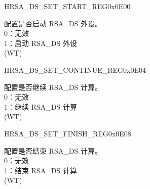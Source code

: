 \begin{register}{H}{RSA\_DS\_SET\_START\_REG}{0x0E00}\label{regdesc:RSADSSETSTARTREG}
%
%
\regnewline%
\begin{regdesc}\begin{reglist}
\label{fielddesc:RSADSSETSTART}\item [RSA\_DS\_SET\_START] 配置是否启动 RSA\_DS 外设。\\
0：无效\\
1：启动 RSA\_DS 外设\\
(WT)
\end{reglist}\end{regdesc}
\end{register}


\begin{register}{H}{RSA\_DS\_SET\_CONTINUE\_REG}{0x0E04}\label{regdesc:RSADSSETCONTINUEREG}
%
%
\regnewline%
\begin{regdesc}\begin{reglist}
\label{fielddesc:RSADSSETCONTINUE}\item [RSA\_DS\_SET\_CONTINUE] 配置是否继续 RSA\_DS 计算。\\
0：无效\\
1：继续 RSA\_DS 计算\\
(WT)
\end{reglist}\end{regdesc}
\end{register}


\begin{register}{H}{RSA\_DS\_SET\_FINISH\_REG}{0x0E08}\label{regdesc:RSADSSETFINISHREG}
%
%
\regnewline%
\begin{regdesc}\begin{reglist}
\label{fielddesc:RSADSSETFINISH}\item [RSA\_DS\_SET\_FINISH] 配置是否结束 RSA\_DS 计算。\\
0：无效\\
1：结束 RSA\_DS 计算\\
(WT)
\end{reglist}\end{regdesc}
\end{register}


